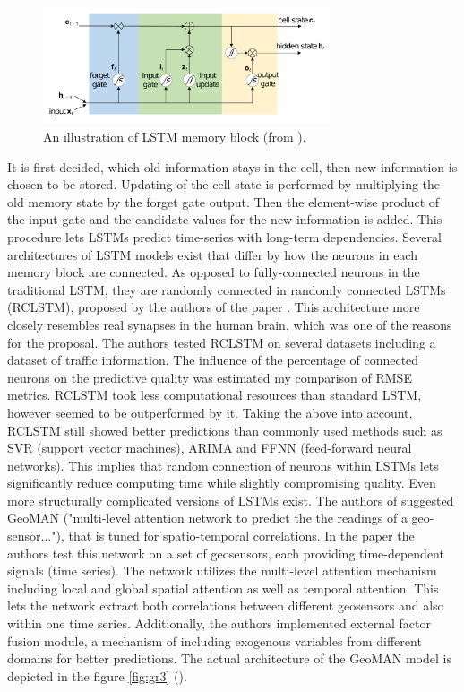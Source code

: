 \documentclass[13pt, a4paper]{article}
\begin{document}
\begin{enumerate}
\begin{figure}[t]\vspace*{4pt}
	\centerline{\includegraphics[width=0.75\textwidth]{./visuals/gr2.pdf}}
	\caption{An illustration of LSTM memory block (from \cite{hua2019deep}).}
\label{fig:gr2}
\end{figure}
It is first decided, which old information stays in the cell, then new information is chosen to be stored. Updating of the cell state is performed by multiplying the old memory state by the forget gate output. Then the element-wise product of the input gate and the candidate values for the new information is added. This procedure lets LSTMs predict time-series with long-term dependencies. Several architectures of LSTM models exist that differ by how the neurons in each memory block are connected. As opposed to fully-connected neurons in the traditional LSTM, they are randomly connected in randomly connected LSTMs (RCLSTM), proposed by the authors of the paper \cite{hua2019deep}. This architecture more closely resembles real synapses in the human brain, which was one of the reasons for the proposal. The authors tested RCLSTM on several datasets including a dataset of traffic information. The influence of the percentage of connected neurons on the predictive quality was estimated my comparison of RMSE metrics. RCLSTM took less computational resources than standard LSTM, however seemed to be outperformed by it. Taking the above into account, RCLSTM still showed better predictions than commonly used methods such as SVR (support vector machines), ARIMA and FFNN (feed-forward neural networks). This implies that random connection of neurons within LSTMs lets significantly reduce computing time while slightly compromising quality.
Even more structurally complicated versions of LSTMs exist. The authors of \cite{liang2018geoman} suggested GeoMAN ("multi-level attention network to predict the the readings of a geo-sensor..."), that is tuned for spatio-temporal correlations. In the paper the authors test this network on a set of geosensors, each providing time-dependent signals (time series). The network utilizes the multi-level attention mechanism including local and global spatial attention as well as temporal attention. This lets the network extract both correlations between different geosensors and also within one time series. Additionally, the authors implemented external factor fusion module, a mechanism of including exogenous variables from different domains for better predictions. The actual architecture of the GeoMAN model is depicted in the figure \ref{fig:gr3} (\cite{liang2018geoman}).

\end{enumerate}
\end{document}
